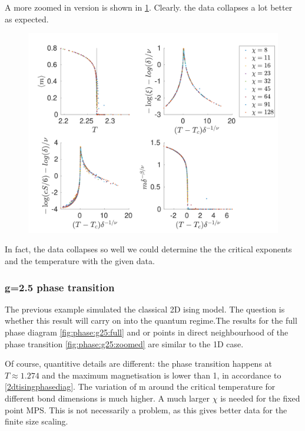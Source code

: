 A more zoomed in version is shown in \cref{fig:phase:g0:zoomed}. Clearly. the data collapses a lot better as expected.
\begin{figure}
  \center
  \includegraphics[width=\textwidth]{Figuren/phasediag/g0/zoomed.pdf}
  \caption{  }
  \label{fig:phase:g0:zoomed}
\end{figure}
In fact, the data collapses so well we could determine the the critical exponents and the temperature with the given data.


\subsubsection{g=2.5 phase transition }

The previous example simulated the classical 2D ising model. The question is whether this result will carry on into the quantum regime.The results for the full phase diagram \cref{fig:phase:g25:full} and or points in direct neighbourhood of the phase transition \cref{fig:phase:g25:zoomed} are similar to the 1D case.

Of course, quantitive details are different: the phase transition happens at $T\approx 1.274$ and the maximum magnetisation is lower than 1, in accordance to \cref{2dtisingphasediag}. The variation of m around the critical temperature for different bond dimensions is much higher. A much larger $\chi$ is needed for the fixed point MPS. This is not necessarily a problem, as this gives better data for the finite size scaling.

